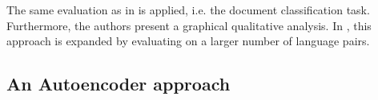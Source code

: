 The same evaluation as in \cite{klementiev2012inducing} is applied, i.e. the document classification task. Furthermore, the authors present a graphical qualitative analysis. In \cite{Hermann2014}, this approach is expanded by evaluating on a larger number of language pairs.

\subsection{An Autoencoder approach}


